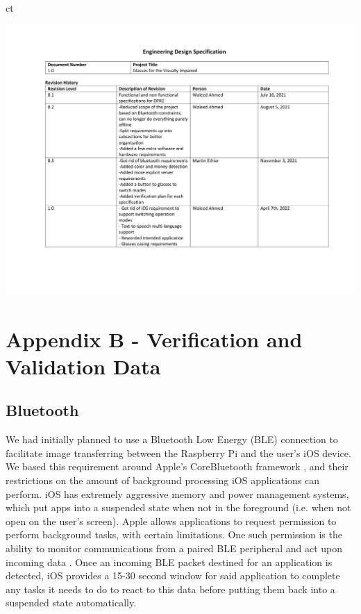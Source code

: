 ct\documentclass[a4paper,11pt]{article}
\begin{document}
\begin{landscape}
\begin{center}
        \newpage
        \includegraphics[page=6,width={0.86\linewidth}]{pdf/eds_1.0.pdf}
    \end{center}
\end{landscape}


\newpage
\section{Appendix B - Verification and Validation Data}
\subsection{Bluetooth}
\label{bluetooth}
We had initially planned to use a Bluetooth Low Energy (BLE) connection to facilitate image transferring between the Raspberry Pi and the user's iOS device. We based this requirement around Apple's CoreBluetooth framework \cite{apple-bluetooth}, and their restrictions on the amount of background processing iOS applications can perform. iOS has extremely aggressive memory and power management systems, which put apps into a suspended state when not in the foreground (i.e. when not open on the user's screen). Apple allows applications to request permission to perform background tasks, with certain limitations. One such permission is the ability to monitor communications from a paired BLE peripheral and act upon incoming data \cite{apple-bluetooth}. Once an incoming BLE packet destined for an application is detected, iOS provides a 15-30 second window for said application to complete any tasks it needs to do to react to this data before putting them back into a suspended state automatically.
\end{document}

